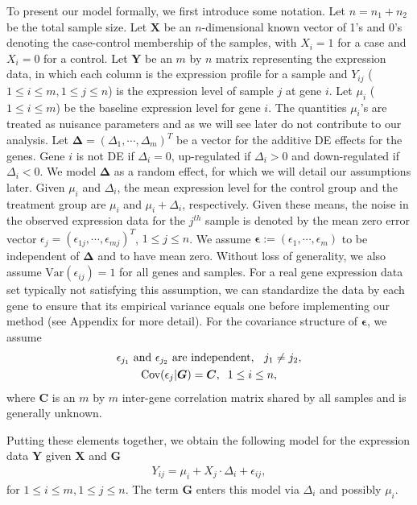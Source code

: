 \documentclass[a4,center,fleqn]{NAR}
\begin{document}
	To present our model formally, we first introduce some notation. Let $n=n_1+n_2$ be the total
	sample size. Let $\bm X$ be an $n$-dimensional known vector of 1's and 0's denoting the case-control
	membership of the samples, with $X_i=1$ for a case and $X_i=0$ for a control. Let $\bm Y$ be an $m$
	by $n$ matrix representing the expression data, in which each column is the expression profile for a
	sample and $Y_{ij}$ ($1\le i\le m, 1\le j\le n$) is the expression level of sample $j$ at gene
	$i$. Let $\mu_i$ ($1\le i\le m$) be the baseline expression level for gene $i$. The quantities 
	$\mu_i$'s are
	treated as nuisance parameters and as we will see later do not contribute to our analysis. Let $\bm
	\Delta=(\Delta_1, \cdots, \Delta_m)^T$ be a vector for the additive DE effects for the genes. Gene
	$i$ is not DE if $\Delta_i=0$, up-regulated if $\Delta_i >0 $ and down-regulated if $\Delta_i<0$. We
	model $\bm \Delta$ as a random effect, for which we will detail our assumptions later. Given $\mu_i$
	and $\Delta_i$, the mean expression level for the control group and the treatment group are
	$\mu_i$ and $\mu_i+\Delta_i$, respectively. Given these means, the noise in the observed expression
	data for the $j^{th}$ sample is denoted by the mean zero error vector
	$\epsilon_j=(\epsilon_{1j},\cdots,\epsilon_{mj})^T$, $1\le j\le n$. We assume
	$\bm\epsilon:=(\epsilon_1,\cdots,\epsilon_m)$ to be independent of $\bm \Delta$ and to have mean
	zero. Without loss of generality, we also assume $\mbox{Var}(\epsilon_{ij})=1$ for all genes and
	samples. For a real gene expression data set typically not satisfying this assumption, we can
	standardize the data by each gene to ensure that its empirical variance equals one before 
	implementing
	our method (see Appendix for more detail). For the covariance structure of $\bm \epsilon$, we 
	assume 
	\begin{gather}
	\text{$\epsilon_{j_1}$ and $\epsilon_{j_2}$ are independent, \;\;$j_1\ne
		j_2$},\label{eq:gene_indep}\\
	\mbox{Cov}(\epsilon_j|\bm G)=\bm C, \;\;1\le i\le n,\label{eq:gene_cor}
	\end{gather}
	where $\bm C$ is an $m$ by $m$ inter-gene correlation matrix shared by all samples and is
	generally unknown.
	
	Putting these elements together, we obtain the following model for the expression data $\bm Y$
	given $\bm X$ and $\bm G$ 
	\begin{align}
	\label{eq:Ymodel}
	Y_{ij} = \mu_i + X_j\cdot\Delta_i + \epsilon_{ij},
	\end{align}
	for $1\le i\le m, 1\le j\le n$. The term $\bm G$ enters this model via $\Delta_i$ and possibly 
	$\mu_i$.
	
\end{document}
